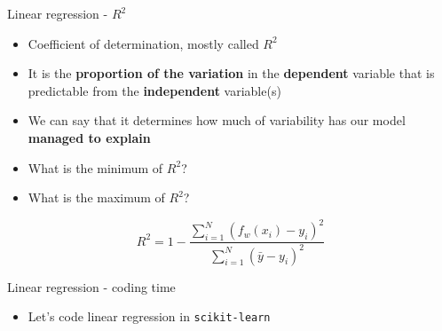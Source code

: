 \documentclass[aspectratio=169]{beamer}
\begin{document}
\begin{frame}{Linear regression - $R^2$}
    \begin{itemize}
        \item Coefficient of determination, mostly called $R^2$
        \item It is the \textbf{proportion of the variation} in the \textbf{dependent}  variable that is predictable from the \textbf{independent} variable(s)
        \item We can say that it determines how much of variability has our model \textbf{managed to explain}
        \item What is the minimum of $R^2$?
        \item What is the maximum of $R^2$?
    \end{itemize}

    $$ R^2 = 1 - \frac{\sum_{i=1}^N(f_w(x_i) - y_i)^2}{\sum_{i=1}^N(\bar{y} - y_i)^2} $$
\end{frame}
\begin{frame}{Linear regression - coding time}
    \begin{itemize}
        \item Let's code linear regression in \texttt{scikit-learn}
    \end{itemize}
\end{frame}
\end{document}
